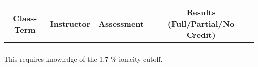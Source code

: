 \begin{outcomes}
	\begin{center}
		\begin{tabular}{cccc}
			\hline\hline
                Class-Term & Instructor & Assessment & Results (Full/Partial/No Credit) \\
			\hline
                 &  &  &  \\
			\hline
		\end{tabular}
	\end{center}
\end{outcomes}

\begin{comments}

This requires knowledge of the 1.7 \% ionicity cutoff.
	
\end{comments}